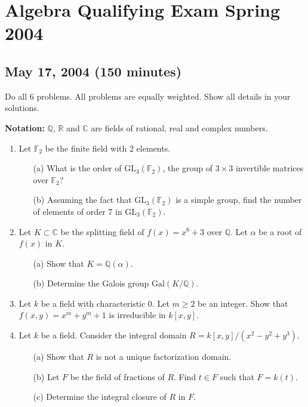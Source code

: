 \documentclass{article}
\begin{document}
\section*{Algebra Qualifying Exam Spring 2004}
\subsection*{May 17, 2004 (150 minutes)}

Do all 6 problems. All problems are equally weighted. Show all details in your solutions.

\textbf{Notation:} \(\mathbb{Q}\), \(\mathbb{R}\) and \(\mathbb{C}\) are fields of rational, real and complex numbers.

\begin{enumerate}
    \item Let \(\mathbb{F}_2\) be the finite field with 2 elements.
    \begin{itemize}
        \item[(a)] What is the order of \(\text{GL}_3(\mathbb{F}_2)\), the group of \(3 \times 3\) invertible matrices over \(\mathbb{F}_2\)?
        \item[(b)] Assuming the fact that \(\text{GL}_3(\mathbb{F}_2)\) is a simple group, find the number of elements of order 7 in \(\text{GL}_3(\mathbb{F}_2)\).
    \end{itemize}

    \item Let \(K \subset \mathbb{C}\) be the splitting field of \(f(x) = x^6 + 3\) over \(\mathbb{Q}\). Let \(\alpha\) be a root of \(f(x)\) in \(K\).
    \begin{itemize}
        \item[(a)] Show that \(K = \mathbb{Q}(\alpha)\).
        \item[(b)] Determine the Galois group \(\text{Gal}(K/\mathbb{Q})\).
    \end{itemize}

    \item Let \(k\) be a field with characteristic 0. Let \(m \geq 2\) be an integer. Show that \(f(x,y) = x^m + y^m + 1\) is irreducible in \(k[x,y]\).

    \item Let \(k\) be a field. Consider the integral domain \(R = k[x,y]/(x^2 - y^2 + y^3)\).
    \begin{itemize}
        \item[(a)] Show that \(R\) is not a unique factorization domain.
        \item[(b)] Let \(F\) be the field of fractions of \(R\). Find \(t \in F\) such that \(F = k(t)\).
        \item[(c)] Determine the integral closure of \(R\) in \(F\).
    \end{itemize}


\end{enumerate}
\end{document}
